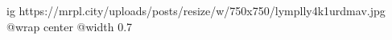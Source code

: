  
 
 
 
 

\ifcmt
  ig https://mrpl.city/uploads/posts/resize/w/750x750/lymplly4k1urdmav.jpg
  @wrap center
  @width 0.7
\fi
